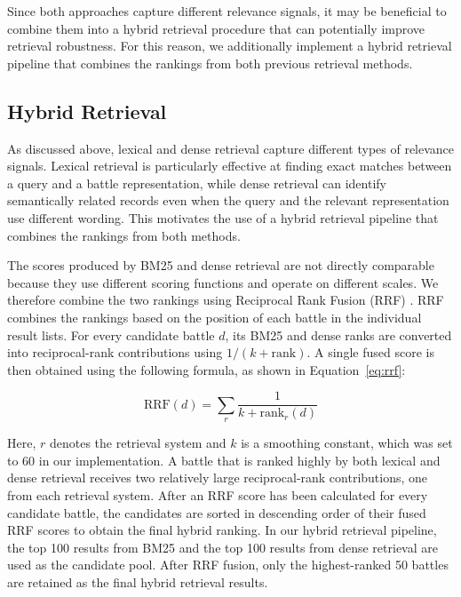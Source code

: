 Since both approaches capture different relevance signals, it may be beneficial to combine them into a hybrid retrieval procedure that can potentially improve retrieval robustness. For this reason, we additionally implement a hybrid retrieval pipeline that combines the rankings from both previous retrieval methods.
\subsection{Hybrid Retrieval}
As discussed above, lexical and dense retrieval capture different types of relevance signals. Lexical retrieval is particularly effective at finding exact matches between a query and a battle representation, while dense retrieval can identify semantically related records even when the query and the relevant representation use different wording. This motivates the use of a hybrid retrieval pipeline that combines the rankings from both methods.

The scores produced by BM25 and dense retrieval are not directly comparable because they use different scoring functions and operate on different scales. We therefore combine the two rankings using Reciprocal Rank Fusion (RRF) \citep{cormack2009rrf}. RRF combines the rankings based on the position of each battle in the individual result lists. 
For every candidate battle $d$, its BM25 and dense ranks are converted into reciprocal-rank contributions using $1/(k + \mathrm{rank})$.
A single fused score is then obtained using the following formula, as shown in Equation~\eqref{eq:rrf}:

\begin{equation}
    \mathrm{RRF}(d) =
    \sum_{r} \frac{1}{k + \mathrm{rank}_r(d)}
    \label{eq:rrf}
\end{equation}

Here, $r$ denotes the retrieval system and $k$ is a smoothing constant, which was set to 60 in our implementation. A battle that is ranked highly by both lexical and dense retrieval receives two relatively large reciprocal-rank contributions, one from each retrieval system. After an RRF score has been calculated for every candidate battle, the candidates are sorted in descending order of their fused RRF scores to obtain the final hybrid ranking. In our hybrid retrieval pipeline, the top 100 results from BM25 and the top 100 results from dense retrieval are used as the candidate pool. After RRF fusion, only the highest-ranked 50 battles are retained as the final hybrid retrieval results. 

